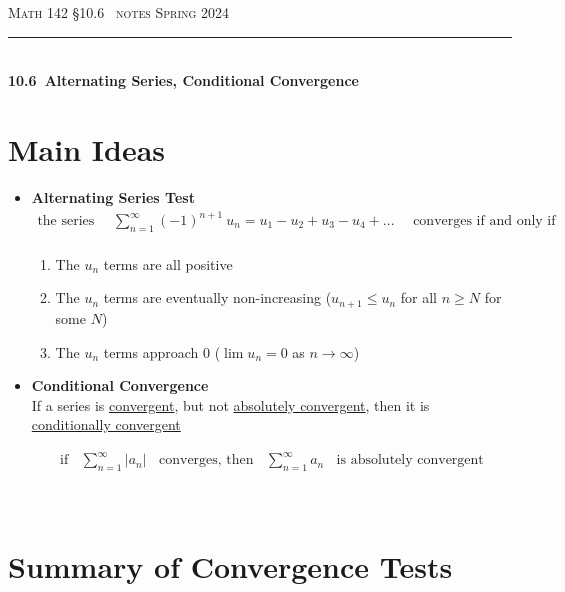 \documentclass{article}
\def\chapt{10.6}
\begin{document}
\noindent
{\scshape Math 142} \hfill {\scshape \S\chapt~ notes} \hfill {\scshape Spring 2024}

\smallskip

\hrule

\bigskip

\hfill
\\

{
\huge
\noindent
\textbf{\chapt~Alternating Series, Conditional Convergence}
}

\section*{Main Ideas}

\begin{itemize}

\item
\textbf{Alternating Series Test}
\begin{gather*}
\text{the series}~~~~~~
\sum_{n=1}^{\infty} (-1)^{n+1} ~u_n = u_1 - u_2 + u_3 - u_4 + ...
~~~~~~\text{converges if and only if}
\\
\end{gather*}

\begin{enumerate}
\item
The $u_n$ terms are all positive

\item
The $u_n$ terms are eventually non-increasing ($u_{n+1} \leq u_n$ for all $n \geq N$ for some $N$)

\item
The $u_n$ terms approach 0 ($\lim u_n=0$ as $n\to \infty$)
\end{enumerate}

\item
\textbf{Conditional Convergence}
\\

If a series is \underline{convergent}, but not \underline{absolutely convergent},
then it is \underline{conditionally convergent}

\begin{gather*}
\text{if}~~~~
\sum_{n=1}^{\infty} |a_n|
~~~~\text{converges, then}~~~~
\sum_{n=1}^{\infty} a_n
~~~~\text{is absolutely convergent}
\end{gather*}

\end{itemize}
\hfill
\\

\section*{Summary of Convergence Tests}
\end{document}
